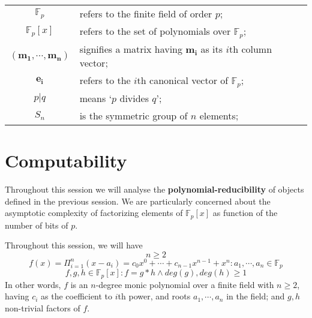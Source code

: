 \documentclass[a4paper,10pt]{article}
\theoremstyle{plain}
\theoremstyle{definition}
\theoremstyle{named}
\begin{document}
\begin{flushleft}
\begin{tabular}{c l}
    $\mathbb{F}_p$ & refers to the finite field of order $p$;\\
    $\mathbb{F}_p[x]$ & refers to the set of polynomials over $\mathbb{F}_p$;\\
    $\left(\mathbf{m_1},\cdots,\mathbf{m_n}\right)$ & signifies a matrix having $\mathbf{m_i}$ as its $i$th column vector;\\
    $\mathbf{e_i}$ & refers to the $i$th canonical vector of $\mathbb{F}_p$;\\
    $p|q$ & means `$p$ divides $q$';\\
    $S_n$ & is the symmetric group of $n$ elements;\\
\end{tabular}
\end{flushleft}

\section{Computability}

Throughout this session we will analyse the \textbf{polynomial-reducibility} of objects defined in the previous session. 
We are particularly concerned about the asymptotic complexity of factorizing elements of $\mathbb{F}_p[x]$ as function of the number of bits of $p$.

Throughout this session, we will have
\begin{equation}
n \geq 2
\end{equation}
\begin{equation}
f(x) = \Pi_{i = 1}^{n}(x-a_i) = c_0x^0+\cdots+c_{n-1}x^{n-1}+x^n : a_1, \cdots, a_n \in \mathbb{F}_p
\end{equation}
\begin{equation}
f, g, h \in \mathbb{F}_p[x] : f = g*h \land deg(g), deg(h) \geq 1
\end{equation}
In other words, $f$ is an $n$-degree monic polynomial over a finite field with $n\geq2$, having $c_i$ as the coefficient to $i$th power, and roots $a_1, \cdots, a_n$ in the field; and $g, h$ non-trivial factors of $f$.
\end{document}
